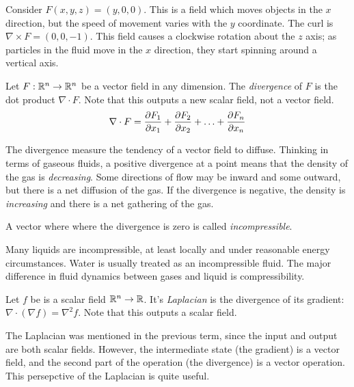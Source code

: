 \documentclass[fleqn,letterpaper]{report}
\begin{document}
\begin{example}
Consider $F(x,y,z) = (y,0,0)$. This is a field
which moves objects in the $x$ direction, but the speed of
movement varies with the $y$ coordinate. The curl is $\nabla
\times F = (0,0,-1)$. This field causes a clockwise rotation
about the $z$ axis; as particles in the fluid move in the $x$
direction, they start spinning around a vertical axis. 
\end{example}

\begin{defn}
Let $F: \mathbb{R}^n \rightarrow \mathbb{R}^n$ be a vector field in any
dimension. The \emph{divergence} of $F$ is the dot product $\nabla \cdot
F$. Note that this outputs a new scalar field, not a vector
field.
\begin{equation*}
\nabla \cdot F = \frac{\partial F_1}{\partial x_1} + \frac{\partial
F_2}{\partial x_2} + \ldots + \frac{\partial F_n}{\partial x_n}
\end{equation*}
\end{defn}

The divergence measure the tendency of a vector field to
diffuse. Thinking in terms of gaseous fluids, a positive
divergence at a point means that the density of the gas is
\emph{decreasing}. Some directions of flow may be inward and
some outward, but there is a net diffusion of the gas. If the
divergence is negative, the density is \emph{increasing} and there
is a net gathering of the gas. 

\begin{defn}
A vector where where the divergence is zero
is called \emph{incompressible}.
\end{defn}

Many liquids are incompressible, at least locally and under
reasonable energy circumstances. Water is usually treated as
an incompressible fluid. The major difference in fluid
dynamics between gases and liquid is compressibility.

\begin{defn}
Let $f$ be is a scalar field $\mathbb{R}^n \rightarrow \mathbb{R}$. It's
\emph{Laplacian} is the divergence of its gradient: $\nabla
\cdot (\nabla f) = \nabla^2 f$. Note that this outputs a
scalar field.
\end{defn}

The Laplacian was mentioned in the previous
term, since the input and output are both scalar fields.
However, the intermediate state (the gradient) is a vector
field, and the second part of the operation (the divergence)
is a vector operation. This persepctive of the Laplacian is
quite useful. 
\end{document}

